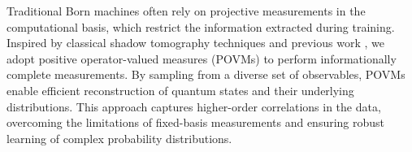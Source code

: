 Traditional Born machines often rely on projective measurements in the computational basis, which restrict the information extracted during training. Inspired by classical shadow tomography techniques and previous work \cite{rudolph_generation_2022, levy_classical_2024, jerbi_shadows_2024}, we adopt positive operator-valued measures (POVMs) to perform informationally complete measurements\cite{mangini_low-variance_2024, garcia-perez_learning_2021, han_unsupervised_2018}. By sampling from a diverse set of observables, POVMs enable efficient reconstruction of quantum states and their underlying distributions. This approach captures higher-order correlations in the data, overcoming the limitations of fixed-basis measurements and ensuring robust learning of complex probability distributions.\cite{meiburg_generative_2024, rudolph_generation_2022, puljak_tn4ml_2025}